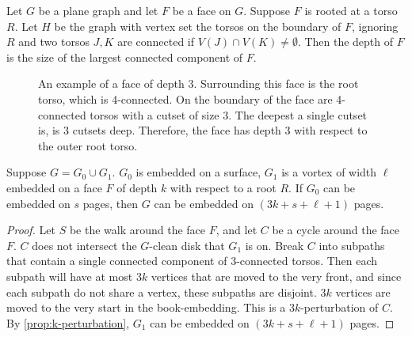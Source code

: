Let $G$ be a plane graph and let $F$ be a face on $G$. Suppose $F$ is rooted at a torso $R$. Let $H$ be the graph with vertex set the torsos on the boundary of $F$, ignoring $R$ and two torsos $J, K$ are connected if $V(J) \cap V(K) \neq \emptyset$. Then the depth of $F$ is the size of the largest connected component of $F$. 
\begin{figure}
	\centering
	
	\caption[Face of depth 3]{An example of a face of depth 3. Surrounding this face is the root torso, which is 4-connected. On the boundary of the face are 4-connected torsos with a cutset of size 3. The deepest a single cutset is, is 3 cutsets deep. Therefore, the face has depth 3 with respect to the outer root torso.}\label{fig:face_depth}
\end{figure}

\begin{proposition}
	Suppose $G = G_0 \cup G_1$. $G_0$ is embedded on a surface, $G_1$ is a vortex of width $\ell$ embedded on a face $F$ of depth $k$ with respect to a root $R$. If $G_0$ can be embedded on $s$ pages, then $G$ can be embedded on $(3k + s + \ell + 1)$ pages.
\end{proposition}

\begin{proof}
	Let $S$ be the walk around the face $F$, and let $C$ be a cycle around the face $F$. $C$ does not intersect the $G$-clean disk that $G_1$ is on. Break $C$ into subpaths that contain a single connected component of $3$-connected torsos. Then each subpath will have at most $3k$ vertices that are moved to the very front, and since each subpath do not share a vertex, these subpaths are disjoint. $3k$ vertices are moved to the very start in the book-embedding. This is a $3k$-perturbation of $C$. By \cref{prop:k-perturbation}, $G_1$ can be embedded on $(3k + s + \ell + 1)$ pages. 
\end{proof}